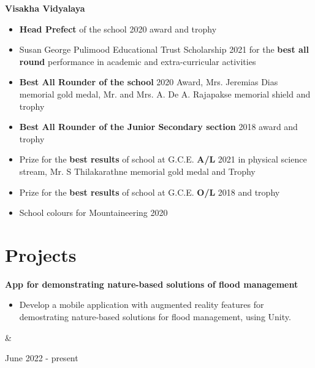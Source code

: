 \documentclass[10pt, a4paper]{article}
\newenvironment{highlights}{
        \begin{itemize}[
                topsep=0pt,
                parsep=0.10 cm,
                partopsep=0pt,
                itemsep=0pt,
                after=\vspace{-1\baselineskip},
                leftmargin=0.4 cm + 3pt
            ]
    }{
        \end{itemize}
    } %
\let\originalTabularx\tabularx
\let\originalEndTabularx\endtabularx
\renewenvironment{tabularx}{\bgroup\centering\originalTabularx}{\originalEndTabularx\par\egroup}
\begin{document}
        \textbf{Visakha Vidyalaya}  \begin{highlights}
        \item \textbf{Head Prefect} of the school 2020 award and trophy
        \item Susan George Pulimood Educational Trust Scholarship 2021 for the \textbf{best all round} performance in academic and extra-curricular activities
	   \item \textbf{Best All Rounder of the school} 2020 Award, Mrs. Jeremias Dias memorial gold medal, Mr. and Mrs. A. De A. Rajapakse memorial shield and trophy
	   \item \textbf{Best All Rounder of the Junior Secondary section} 2018 award and trophy
		\item Prize for the \textbf{best results} of school at G.C.E. \textbf{A/L} 2021 in physical science stream, Mr. S Thilakarathne memorial gold medal and Trophy
		\item Prize for the \textbf{best results} of school at G.C.E. \textbf{O/L} 2018 and trophy
		\item School colours for Mountaineering 2020
	\end{highlights}
        \par\endgroup
    
    \vspace{0.4 cm}
    
    \section{Projects}

        \begin{tabularx}{
            \textwidth-0.4 cm-0.13cm
        }{
            K{0.2 cm}
            R{4.1 cm}
        }
            \textbf{App for demonstrating nature-based solutions of flood management}

            \vspace{0.10 cm}

            \begin{highlights}
                \item Develop a mobile application with augmented reality features for demostrating nature-based solutions for flood management, using Unity.
            \end{highlights}
            &
            

            June 2022 - present
        \end{tabularx}
\end{document}

